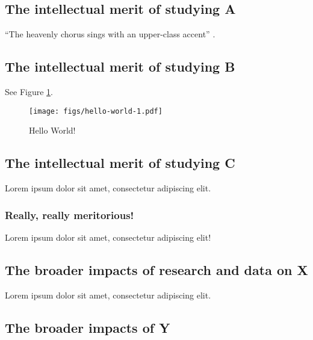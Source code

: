 \documentclass[
      12pt,
        ]{article}
\begin{document}
\setcounter{page}{1}

\hypertarget{the-intellectual-merit-of-studying-a}{%
\subsection{The intellectual merit of studying A}\label{the-intellectual-merit-of-studying-a}}

``The heavenly chorus sings with an upper-class accent'' \citep{Schattschneider1975}.

\hypertarget{the-intellectual-merit-of-studying-b}{%
\subsection{The intellectual merit of studying B}\label{the-intellectual-merit-of-studying-b}}

See Figure \ref{fig:hello-world}.

\begin{figure}
\centering
\texttt{[image: figs/hello-world-1.pdf]}
\caption{\label{fig:hello-world}Hello World!}
\end{figure}

\hypertarget{the-intellectual-merit-of-studying-c}{%
\subsection{The intellectual merit of studying C}\label{the-intellectual-merit-of-studying-c}}

Lorem ipsum dolor sit amet, consectetur adipiscing elit.

\hypertarget{really-really-meritorious}{%
\subsubsection{Really, really meritorious!}\label{really-really-meritorious}}

Lorem ipsum dolor sit amet, consectetur adipiscing elit!

\hypertarget{the-broader-impacts-of-research-and-data-on-x}{%
\subsection{The broader impacts of research and data on X}\label{the-broader-impacts-of-research-and-data-on-x}}

Lorem ipsum dolor sit amet, consectetur adipiscing elit.

\hypertarget{the-broader-impacts-of-y}{%
\subsection{The broader impacts of Y}\label{the-broader-impacts-of-y}}
\end{document}
